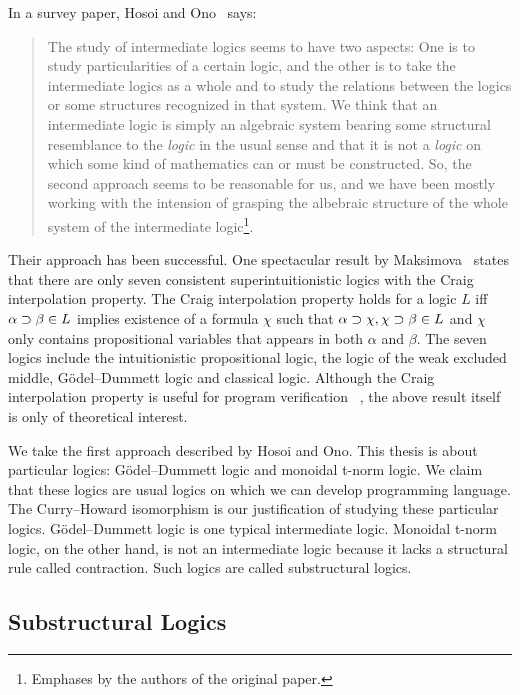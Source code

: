 In a survey paper, Hosoi and Ono~\cite{hosoi-ono} says:
 \begin{quote}
  The study of intermediate logics seems to have two aspects: One is to
  study particularities of a certain logic, and the other is to take the
  intermediate logics as a whole and to study the relations between the
  logics or some structures recognized in that system.  We think that an
  intermediate logic is simply an algebraic system bearing some
  structural resemblance to the \textit{logic} in the usual sense and
  that it is not a \textit{logic} on which some kind of mathematics can
  or must be constructed.  So, the second approach seems to be
  reasonable for us, and we have been mostly working with the intension
  of grasping the albebraic structure of the whole system of the
  intermediate logic\footnote{Emphases by the authors of the original
  paper.}.
 \end{quote}
Their approach has been successful.
One spectacular result by Maksimova~\citep{maksimova77}
states that there are only seven consistent
superintuitionistic logics with the Craig interpolation
property.
The Craig interpolation property holds for a logic $L$ iff $\alpha
\supset\beta\in L$ implies existence of a formula $\chi$ such that
$\alpha\supset\chi, \chi\supset\beta\in L$ and $\chi$ only contains propositional
variables that appears in both $\alpha$ and $\beta$.
The seven logics include the intuitionistic propositional logic, the logic of
the weak excluded middle,
G\"odel--Dummett logic
and classical logic.
Although the Craig interpolation property is useful for program
verification~\citep{unno2009} ,
the above result itself is only of
theoretical interest.

We take the first approach described by Hosoi and Ono.
This thesis is about particular logics: G\"odel--Dummett logic and
monoidal t-norm logic.  We claim that these logics are usual logics
on which we can develop programming language.  The Curry--Howard
isomorphism is our justification of studying these particular logics.
G\"odel--Dummett logic is one typical intermediate logic.
Monoidal t-norm logic, on the other hand, is not an intermediate logic
because it lacks a structural rule called contraction.  Such logics are
called substructural logics.

\subsection{Substructural Logics}
\label{linear}

